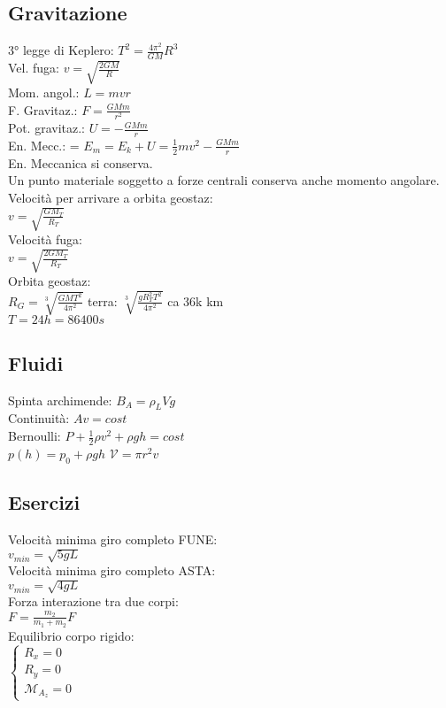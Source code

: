 \documentclass[8pt]{scrreprt}
\begin{document}
\begin{multicols*}{3}
\vspace{-3mm}
\subsection*{Gravitazione}
3° legge di Keplero: $T^2 = \frac{4\pi^2}{GM}R^3$\\
Vel. fuga: $v = \sqrt{\frac{2GM}{R}}$\\
Mom. angol.: $L = mvr$\\
F. Gravitaz.: $F = \frac{GMm}{r^2}$\\
Pot. gravitaz.: $U = -\frac{GMm}{r}$\\
En. Mecc.: = $E_m = E_k + U = \frac{1}{2}mv^2 - \frac{GMm}{r}$\\
En. Meccanica si conserva.\\
Un punto materiale soggetto a forze centrali conserva anche momento angolare.\\
Velocità per arrivare a orbita geostaz:\\
$v = \sqrt{\frac{GM_T}{R_T}}$\\
Velocità fuga:\\
$v = \sqrt{\frac{2GM_T}{R_T}}$\\
Orbita geostaz:\\
$R_G = \sqrt[3]{\frac{GMT^2}{4\pi^2}}$ terra: $\sqrt[3]{\frac{gR_T^2T^2}{4\pi^2}}$ ca 36k km\\
$T = 24h = 86400s$

\vspace{-3mm}
\subsection*{Fluidi}
Spinta archimende: $B_A = \rho_L V g$\\
Continuità: $A v = cost$\\
Bernoulli: $P + \frac{1}{2}\rho v^2 + \rho g h = cost$\\
$p(h) = p_0 + \rho g h$
$\mathcal{V} = \pi r^2 v$

\vspace{-3mm}
\subsection*{Esercizi}
Velocità minima giro completo FUNE:\\
$v_{min} = \sqrt{5gL}$\\
Velocità minima giro completo ASTA:\\
$v_{min} = \sqrt{4gL}$\\
Forza interazione tra due corpi:\\
$F = \frac{m_2}{m_1 +m_2}F$\\
Equilibrio corpo rigido:\\
$\left\{ \begin{array}{ll} R_x = 0 \\ R_y = 0 \\ \mathcal{M}_{A_z} = 0 \end{array} \right.$


\end{multicols*}
\end{document}
